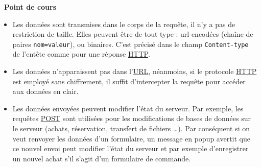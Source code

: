 \documentclass[
  11pt,
]{article}
\newcommand{\passthrough}[1]{#1}
\providecommand{\tightlist}{%
  \setlength{\itemsep}{0pt}\setlength{\parskip}{0pt}}
\newcounter{cours}
\newenvironment{cours}[1]
{\par \medskip   \addtocounter{cours}{1} \noindent  
\begin{bclogo}[arrondi =0.1,  ombre = true, barre=none, logo=\bcbook, marge=4]{~\textbf{Point de cours} \textbf{\thecours} {\itshape #1} }  \par}
{
\end{bclogo}
 \par \bigskip }
\begin{document}
\begin{cours}{}
\begin{itemize}
\tightlist
\item
  Les données sont transmises dans le corps de la requête, il n'y a pas
  de restriction de taille. Elles peuvent être de tout type :
  url-encodées (chaîne de paires \passthrough{\lstinline!nom=valeur!}),
  ou binaires. C'est précisé dans le champ
  \passthrough{\lstinline!Content-type!} de l'entête comme pour une
  réponse
  \href{https://developer.mozilla.org/fr/docs/Glossaire/HTTP}{HTTP}.
\item
  Les données n'apparaissent pas dans
  l'\href{https://developer.mozilla.org/fr/docs/Glossaire/URL}{URL},
  néanmoins, si le protocole
  \href{https://developer.mozilla.org/fr/docs/Glossaire/HTTP}{HTTP} est
  employé sans chiffrement, il suffit d'intercepter la requête pour
  accéder aux données en clair.
\item
  Les données envoyées peuvent modifier l'état du serveur. Par exemple,
  les requêtes
  \href{https://developer.mozilla.org/fr/docs/Web/HTTP/M\%C3\%A9thode/POST}{POST}
  sont utilisées pour les modifications de bases de données sur le
  serveur (achats, réservation, transfert de fichiers \ldots). Par
  conséquent si on veut renvoyer les données d'un formulaire, un message
  en popup avertit que ce nouvel envoi peut modifier l'état du serveur
  et par exemple d'enregistrer un nouvel achat s'il s'agit d'un
  formulaire de commande.
\end{itemize}

\end{cours}
\end{document}
